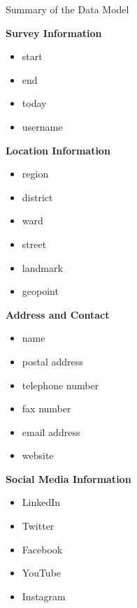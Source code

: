 \documentclass[a4paper,12pt,twoside]{article}
\begin{document}
\newpage
\begin{center}
    \large Summary of the Data Model
\end{center}
\begin{multicols}{3}
\begin{mdframed}[hidealllines=true,backgroundcolor=OMDTZgreen!10,innerleftmargin=6pt,innerrightmargin=6pt,leftmargin=-3pt,rightmargin=-3pt]

\textbf {Survey Information}
\begin{itemize}
    \item start
    \item end
    \item today
    \item username
\end{itemize}
\textbf {Location Information}
\begin{itemize}
    \item region
    \item district
    \item ward
    \item street
    \item landmark
    \item geopoint
\end{itemize}
\end{mdframed}
\begin{mdframed}[hidealllines=true,backgroundcolor=OMDTZgreen!10,innerleftmargin=6pt,innerrightmargin=6pt,leftmargin=-3pt,rightmargin=-3pt]
\textbf {Address and Contact}
\begin{itemize}
    \item name
    \item postal address
    \item telephone number
    \item fax number
    \item email address
    \item website
\end{itemize}
\textbf {Social Media Information}
\begin{itemize}
    \item LinkedIn
    \item Twitter
    \item Facebook
    \item YouTube
    \item Instagram
    \vfill\null
    \columnbreak
\end{itemize}
\end{mdframed}
\begin{mdframed}[hidealllines=true,backgroundcolor=OMDTZgreen!10,innerleftmargin=6pt,innerrightmargin=6pt,leftmargin=-3pt,rightmargin=-3pt]

\end{mdframed}
\end{multicols}
\end{document}
